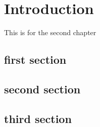 \chapter{Introduction}
 This is for the second chapter
\section{first section}
\section{second section}
\section{third section}